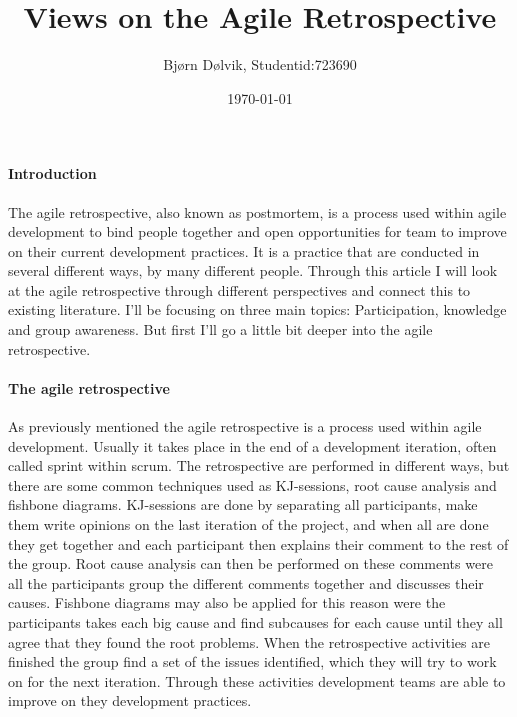\documentclass{article}
\begin{document}
\title{Views on the Agile Retrospective}
\date{\today{}}
\author{Bjørn Dølvik, Studentid:723690}

\maketitle

\paragraph{Introduction}
The agile retrospective, also known as postmortem, is a process used within agile development to bind people together and open opportunities for team to improve on their current development practices. It is a practice that are conducted in several different ways, by many different people. Through this article I will look at the agile retrospective through different perspectives and connect this to existing literature. I'll be focusing on three main topics: Participation, knowledge and group awareness. But first I'll go a little bit deeper into the agile retrospective.

\paragraph{The agile retrospective}
As previously mentioned the agile retrospective is a process used within agile development. Usually it takes place in the end of a development iteration, often called sprint within scrum. The retrospective are performed in different ways, but there are some common techniques used as KJ-sessions, root cause analysis and fishbone diagrams. KJ-sessions are done by separating all participants, make them write opinions on the last iteration of the project, and when all are done they get together and each participant then explains their comment to the rest of the group. Root cause analysis can then be performed on these comments were all the participants group the different comments together and discusses their causes. Fishbone diagrams may also be applied for this reason were the participants takes each big cause and find subcauses for each cause until they all agree that they found the root problems. When the retrospective activities are finished the group find a set of the issues identified, which they will try to work on for the next iteration. Through these activities development teams are able to improve on they development practices. 
\end{document}
